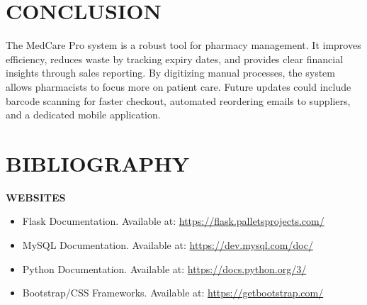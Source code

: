 \documentclass[12pt, a4paper]{report}
\begin{document}
\chapter{CONCLUSION}
The MedCare Pro system is a robust tool for pharmacy management. It improves efficiency, reduces waste by tracking expiry dates, and provides clear financial insights through sales reporting. By digitizing manual processes, the system allows pharmacists to focus more on patient care. Future updates could include barcode scanning for faster checkout, automated reordering emails to suppliers, and a dedicated mobile application.

\chapter*{BIBLIOGRAPHY}
\textbf{WEBSITES}
\begin{itemize}
    \item Flask Documentation. Available at: \url{https://flask.palletsprojects.com/}
    \item MySQL Documentation. Available at: \url{https://dev.mysql.com/doc/}
    \item Python Documentation. Available at: \url{https://docs.python.org/3/}
    \item Bootstrap/CSS Frameworks. Available at: \url{https://getbootstrap.com/}
\end{itemize}
\end{document}
